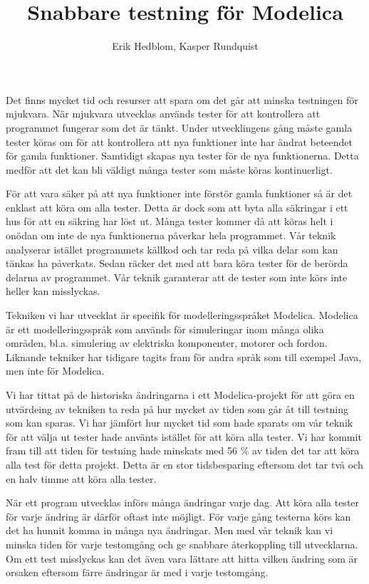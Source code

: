 \documentclass{popsci}
\author{Erik Hedblom, Kasper Rundquist}
\title{Snabbare testning för Modelica}
\begin{document}


{\noindent Det finns mycket tid och resurser att spara om det går att minska testningen för mjukvara. När mjukvara utvecklas används tester för att kontrollera att programmet fungerar som det är tänkt. Under utvecklingens gång måste gamla tester köras om för att kontrollera att nya funktioner inte har ändrat beteendet för gamla funktioner. Samtidigt skapas nya tester för de nya funktionerna. Detta medför att det kan bli väldigt många tester som måste köras kontinuerligt.

För att vara säker på att nya funktioner inte förstör gamla funktioner så är det enklast att köra om alla tester. Detta är dock som att byta alla säkringar i ett hus för att en säkring har löst ut. Många tester kommer då att köras helt i onödan om inte de nya funktionerna påverkar hela programmet. Vår teknik analyserar istället programmets källkod och tar reda på vilka delar som kan tänkas ha påverkats. Sedan räcker det med att bara köra tester för de berörda delarna av programmet. Vår teknik garanterar att de tester som inte körs inte heller kan misslyckas.

Tekniken vi har utvecklat är specifik för modelleringsspråket Modelica. Modelica är ett modelleringsspråk som används för simuleringar inom många olika områden, bl.a. simulering av elektriska komponenter, motorer och fordon. Liknande tekniker har tidigare tagits fram för andra språk som till exempel Java, men inte för Modelica. 

Vi har tittat på de historiska ändringarna i ett Modelica-projekt för att göra en utvärdeing av tekniken ta reda på hur mycket av tiden som går åt till testning som kan sparas. Vi har jämfört hur mycket tid som hade sparats om vår teknik för att välja ut tester hade använts istället för att köra alla tester. Vi har kommit fram till att tiden för testning hade minskats med 56 \% av tiden det tar att köra alla test för detta projekt. Detta är en stor tidsbesparing eftersom det tar två och en halv timme att köra alla tester.

När ett program utvecklas införs många ändringar varje dag. Att köra alla tester för varje ändring är därför oftast inte möjligt. För varje gång testerna körs kan det ha hunnit komma in många nya ändringar. Men med vår teknik kan vi minska tiden för varje testomgång och ge snabbare återkoppling till utvecklarna. Om ett test misslyckas kan det även vara lättare att hitta vilken ändring som är orsaken eftersom färre ändringar är med i varje testomgång. 
}
\end{document}
